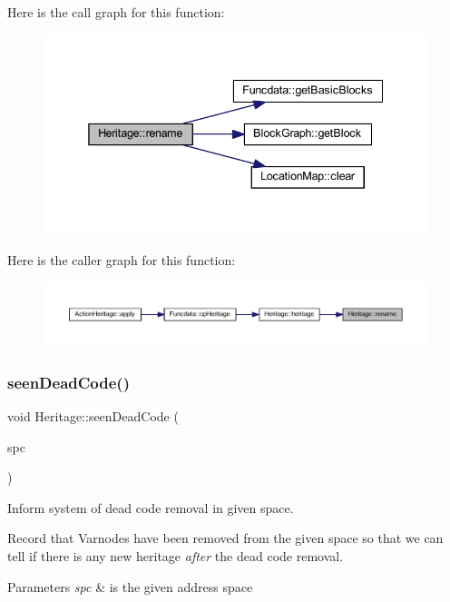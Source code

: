 Here is the call graph for this function\+:
\nopagebreak
\begin{figure}[H]
\begin{center}
\leavevmode
\includegraphics[width=338pt]{class_heritage_a68d25aa348dd9e8c5f13d708b2310772_cgraph}
\end{center}
\end{figure}
Here is the caller graph for this function\+:
\nopagebreak
\begin{figure}[H]
\begin{center}
\leavevmode
\includegraphics[width=350pt]{class_heritage_a68d25aa348dd9e8c5f13d708b2310772_icgraph}
\end{center}
\end{figure}
\mbox{\label{class_heritage_abbcd7a583bd605db1177b9c2e0be599f}} 
\subsubsection{\texorpdfstring{seenDeadCode()}{seenDeadCode()}}
{\footnotesize\ttfamily void Heritage\+::seen\+Dead\+Code (\begin{DoxyParamCaption}\item[{\mbox{\hyperlink{class_addr_space}{Addr\+Space}} $\ast$}]{spc }\end{DoxyParamCaption})}



Inform system of dead code removal in given space. 

Record that Varnodes have been removed from the given space so that we can tell if there is any new heritage {\itshape after} the dead code removal. 
\begin{DoxyParams}{Parameters}
{\em spc} & is the given address space \\
\hline
\end{DoxyParams}


